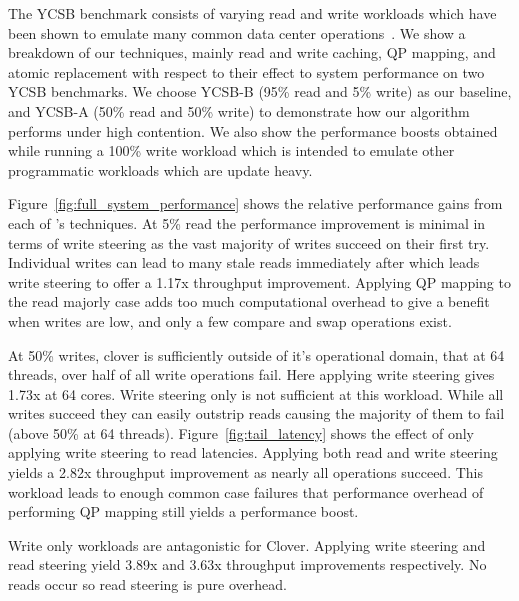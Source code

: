 The YCSB benchmark consists of varying read and write workloads which have been
shown to emulate many common data center operations~\cite{ycsb}. We show a
breakdown of our techniques, mainly read and write caching, QP mapping, and
atomic replacement with respect to their effect to system performance on two
YCSB benchmarks. We choose YCSB-B (95\% read and 5\% write) as our baseline, and
YCSB-A (50\% read and 50\% write) to demonstrate how our algorithm performs
under high contention.  We also show the performance boosts obtained while
running a 100\% write workload which is intended to emulate other programmatic
workloads which are update heavy.

Figure~\ref{fig:full_system_performance} shows the relative performance gains
from each of \sword's techniques. At 5\% read the performance improvement is
minimal in terms of write steering as the vast majority of writes succeed on
their first try. Individual writes can lead to many stale reads immediately
after which leads write steering to offer a 1.17x throughput improvement.
Applying QP mapping to the read majorly case adds too much computational
overhead to give a benefit when writes are low, and only a few compare and swap
operations exist. 

At 50\% writes, clover is sufficiently outside of it's operational domain, that
at 64 threads, over half of all write operations fail. Here applying write
steering gives 1.73x at 64 cores. Write steering only is not sufficient at this
workload. While all writes succeed they can easily outstrip reads causing the
majority of them to fail (above 50\% at 64 threads).
Figure~\ref{fig:tail_latency} shows the effect of only applying write steering
to read latencies. Applying both read and write steering yields a 2.82x
throughput improvement as nearly all operations succeed. This workload leads to
enough common case failures that performance overhead of performing QP mapping
still yields a performance boost.

Write only workloads are antagonistic for Clover. Applying write steering and
read steering yield 3.89x and 3.63x throughput improvements respectively. No
reads occur so read steering is pure overhead.





